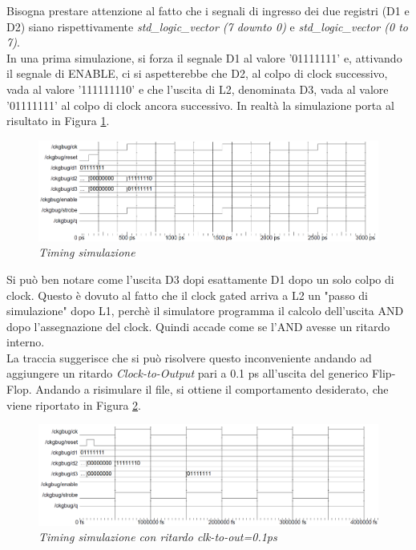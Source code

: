 Bisogna prestare attenzione al fatto che i segnali di ingresso dei due registri (D1 e D2) siano rispettivamente \textit{std\_logic\_vector (7 downto 0)} e \textit{std\_logic\_vector (0 to 7)}. \\
In una prima simulazione, si forza il segnale D1 al valore '01111111' e, attivando il segnale di ENABLE, ci si aspetterebbe che D2, al colpo di clock successivo, vada al valore '111111110' e che l'uscita di L2, denominata D3, vada al valore '01111111' al colpo di clock ancora successivo. In realtà la simulazione porta al risultato in Figura \ref{clock_gat1}.
\begin{figure}[!htb]
	\centering
	\includegraphics[scale=0.6]{immagini/clock_gating1}
	\caption{\textit{Timing simulazione}}
	\label{clock_gat1}
\end{figure}
Si può ben notare come l'uscita D3 dopi esattamente D1 dopo un solo colpo di clock. Questo è dovuto al fatto che il clock gated arriva a L2 un "passo di simulazione" dopo L1, perchè il simulatore programma il calcolo dell'uscita AND dopo l'assegnazione del clock. Quindi accade come se l'AND avesse un ritardo interno. \\
La traccia suggerisce che si può risolvere questo inconveniente andando ad aggiungere un ritardo \textit{Clock-to-Output} pari a 0.1 ps all'uscita del generico Flip-Flop. Andando a risimulare il file, si ottiene il comportamento desiderato, che viene riportato in Figura \ref{clock_gat2}. \\
\newpage
\begin{figure}[!htb]
	\centering
	\includegraphics[scale=0.6]{immagini/clock_gating2}
	\caption{\textit{Timing simulazione con ritardo clk-to-out=0.1ps}}
	\label{clock_gat2}
\end{figure}
